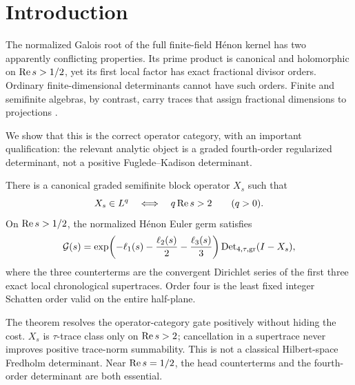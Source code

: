 \section{Introduction}

The normalized Galois root of the full finite-field H\'enon kernel has two
apparently conflicting properties.  Its prime product is canonical and
holomorphic on $\operatorname{Re} s>1/2$, yet its first local factor has exact fractional
divisor orders.  Ordinary finite-dimensional determinants cannot have such
orders.  Finite and semifinite algebras, by contrast, carry traces that assign
fractional dimensions to projections
\cite{FugledeKadison1952,DeLaHarpe2013,HochsKaadSchemaitat2018}.

We show that this is the correct operator category, with an important
qualification: the relevant analytic object is a graded fourth-order
regularized determinant, not a positive Fuglede--Kadison determinant.

\begin{theorem}\label{thm:main}
There is a canonical graded semifinite block operator $X_s$ such that
\[
 X_s\in L^q\quad\Longleftrightarrow\quad q\operatorname{Re} s>2
 \qquad(q>0).
\]
On $\operatorname{Re} s>1/2$, the normalized H\'enon Euler germ satisfies
\[
 \mathcal G(s)=
 \exp\!\left(-\ell_1(s)-\frac{\ell_2(s)}2-\frac{\ell_3(s)}3\right)
 \operatorname{Det}_{4,\tau,\mathrm{gr}}(I-X_s),
\]
where the three counterterms are the convergent Dirichlet series of the first
three exact local chronological supertraces.  Order four is the least fixed
integer Schatten order valid on the entire half-plane.
\end{theorem}

The theorem resolves the operator-category gate positively without hiding
the cost.  $X_s$ is $\tau$-trace class only on $\operatorname{Re} s>2$; cancellation
in a supertrace never improves positive trace-norm summability.  This is not
a classical Hilbert-space Fredholm determinant.  Near $\operatorname{Re} s=1/2$, the
head counterterms and the fourth-order determinant are both essential.

